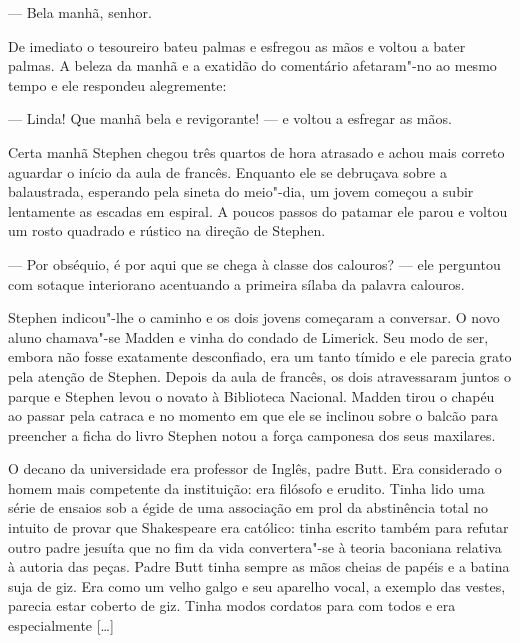 --- Bela manhã, senhor.

De imediato o tesoureiro bateu palmas e esfregou as mãos e voltou a
bater palmas.  A beleza da manhã e a exatidão do comentário afetaram"-no
ao mesmo tempo e ele respondeu alegremente:

--- Linda!  Que manhã bela e revigorante! --- e voltou a esfregar
as mãos.

Certa manhã Stephen chegou três quartos de hora atrasado e
achou mais correto aguardar o início da aula de francês.  Enquanto ele
se debruçava sobre a balaustrada, esperando pela sineta do meio"-dia, um
jovem começou a subir lentamente as escadas em espiral.  A poucos
passos do patamar ele parou e voltou um rosto quadrado e rústico na
direção de Stephen.

--- Por obséquio, é por aqui que se chega à classe dos calouros?
--- ele perguntou com sotaque interiorano acentuando a primeira sílaba da
palavra calouros.

Stephen indicou"-lhe o caminho e os dois jovens começaram a
conversar.  O novo aluno chamava"-se Madden e vinha do condado de
Limerick.  Seu modo de ser, embora não fosse exatamente desconfiado,
era um tanto tímido e ele parecia grato pela atenção de Stephen.
Depois da aula de francês, os dois atravessaram juntos o parque e
Stephen levou o novato à Biblioteca Nacional.  Madden tirou o chapéu ao
passar pela catraca e no momento em que ele se inclinou sobre o balcão
para preencher a ficha do livro Stephen notou a força camponesa dos
seus maxilares.

O decano da universidade era professor de Inglês, padre Butt.  Era
considerado o homem mais competente da instituição: era filósofo e
erudito.  Tinha lido uma série de ensaios sob a égide de uma associação
em prol da abstinência total no intuito de provar que Shakespeare era
católico: tinha escrito também para refutar outro padre jesuíta que no
fim da vida convertera"-se à teoria baconiana relativa à autoria das
peças.  Padre Butt tinha sempre as mãos cheias de papéis e a batina
suja de giz.  Era como um velho galgo e seu aparelho vocal, a exemplo
das vestes, parecia estar coberto de giz.  Tinha modos cordatos para
com todos e era especialmente [\ldots{}]


\bigskip

{
\par}


\bigskip

